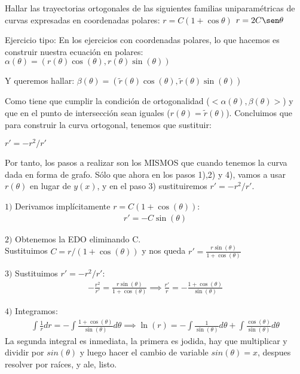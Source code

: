 \documentclass[nochap]{apuntes}
\begin{document}
\begin{problem}[11]
Hallar las trayectorias ortogonales de las siguientes familias uniparamétricas de curvas expresadas en coordenadas polares:
\ppart
$r=C(1+\cos \theta)$
\ppart
$r=2C\sen \theta$

\solution

\begin{expla}
Ejercicio tipo: En los ejercicios con coordenadas polares, lo que hacemos es construir nuestra ecuación en polares:
$\alpha(\theta)=(r(\theta)\cos(\theta),r(\theta)\sin(\theta))$

Y queremos hallar:
$\beta(\theta)=(\tilde{r}(\theta)\cos(\theta),\tilde{r}(\theta)\sin(\theta))$

Como tiene que cumplir la condición de ortogonalidad ($<\alpha(\theta), \beta(\theta)>$) y que en el punto de intersección sean iguales ($r(\theta)=\tilde{r}(\theta)$). Concluimos que para construir la curva ortogonal, tenemos que sustituir:

$r' = -r^2/r'$

Por tanto, los pasos a realizar son los MISMOS que cuando tenemos la curva dada en forma de grafo. Sólo que ahora en los pasos 1),2) y 4), vamos a usar $r(\theta)$ en lugar de $y(x)$, y en el paso 3) sustituiremos $r'=-r^2/r'$. 

\end{expla}

\spart
$1)$ Derivamos implícitamente $r=C(1+\cos(\theta))$:
\begin{gather*}
r'=-C\sin(\theta)
\end{gather*}

$2)$ Obtenemos la EDO eliminando C.\\
Sustituimos $C=r/(1+\cos(\theta))$ y nos queda $r'=\frac{r\sin(\theta)}{1+\cos(\theta)}$

$3)$ Sustituimos  $r'=-r^2/r'$:
\begin{gather*}
-\frac{r^2}{r'}=\frac{r\sin(\theta)}{1+\cos(\theta)} \implies \frac{r'}{r}=-\frac{1+\cos(\theta)}{\sin(\theta)}
\end{gather*}

$4)$ Integramos:
\begin{gather*}
\int \frac{1}{r}dr=-\int\frac{1+\cos(\theta)}{\sin(\theta)}d\theta \implies \ln(r)= -\int\frac{1}{\sin(\theta)}d\theta+\int\frac{\cos(\theta)}{\sin(\theta)}d\theta
\end{gather*}
La segunda integral es inmediata, la primera es jodida, hay que multiplicar y dividir por $sin(\theta)$ y luego hacer el cambio de variable $sin(\theta)=x$, despues resolver por raíces, y ale, listo.


\end{problem}
\end{document}
